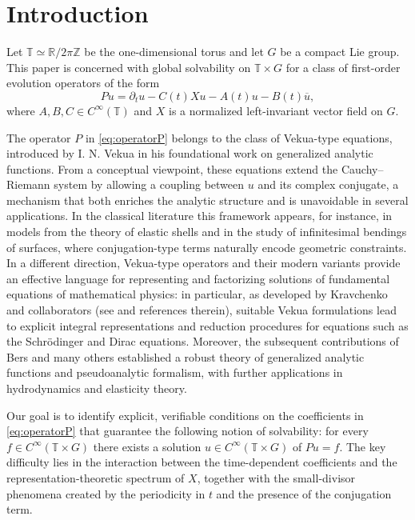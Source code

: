 \documentclass[11pt,reqno]{amsart}
\numberwithin{equation}{section}
\begin{document}
\section{Introduction}

Let $\mathbb{T}\simeq\mathbb{R}/2\pi\mathbb{Z}$ be the one-dimensional torus and let $G$ be a compact Lie group. This paper is concerned with global solvability on $\mathbb{T}\times G$ for a class of first-order evolution operators of the form
\begin{equation}\label{eq:operatorP}
	Pu=\partial_tu-C(t)Xu-A(t)u-B(t)\overline{u},
\end{equation}
where $A,B,C\in C^\infty(\mathbb{T})$ and $X$ is a normalized left-invariant vector field on $G$. 

The operator $P$ in \eqref{eq:operatorP} belongs to the class of Vekua-type equations, introduced by I. N. Vekua \cite{vekua} in his foundational work on generalized analytic functions. From a conceptual viewpoint, these equations extend the Cauchy--Riemann system by allowing a coupling between $u$ and its complex conjugate, a mechanism that both enriches the analytic structure and is unavoidable in several applications. In the classical literature this framework appears, for instance, in models from the theory of elastic shells and in the study of infinitesimal bendings of surfaces, where conjugation-type terms naturally encode geometric constraints. In a different direction, Vekua-type operators and their modern variants provide an effective language for representing and factorizing solutions of fundamental equations of mathematical physics: in particular, as developed by Kravchenko and collaborators (see \cite{Kravchenko2009} and references therein), suitable Vekua formulations lead to explicit integral representations and reduction procedures for equations such as the Schr\"odinger and Dirac equations. Moreover, the subsequent contributions of Bers \cite{Bers} and many others established a robust theory of generalized analytic functions and pseudoanalytic formalism, with further applications in hydrodynamics and elasticity theory.


Our goal is to identify explicit, verifiable conditions on the coefficients in \eqref{eq:operatorP} that guarantee the following notion of solvability: for every $f\in C^\infty(\mathbb{T}\times G)$ there exists a solution $u\in C^\infty(\mathbb{T}\times G)$ of $Pu=f$. The key difficulty lies in the interaction between the time-dependent coefficients and the representation-theoretic spectrum of $X$, together with the small-divisor phenomena created by the periodicity in $t$ and the presence of the conjugation term.
\end{document}
